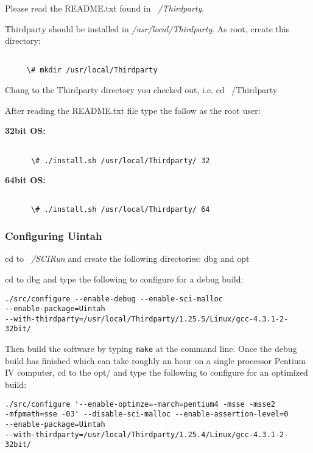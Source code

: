 \documentclass[12pt]{report}
\begin{document}
Please read the README.txt found in \emph{~/Thirdparty}.

Thirdparty should be installed in \emph{/usr/local/Thirdparty}.  As
root, create this directory:

\begin{verbatim}

     \# mkdir /usr/local/Thirdparty

\end{verbatim}

Chang to the Thirdparty directory you checked out, i.e. cd ~/Thirdparty

After reading the README.txt file type the follow as the root user:

\textbf{32bit OS:}

\begin{verbatim}

      \# ./install.sh /usr/local/Thirdparty/ 32

\end{verbatim}

\textbf{64bit OS:}


\begin{verbatim}

      \# ./install.sh /usr/local/Thirdparty/ 64

\end{verbatim}


\subsubsection{Configuring Uintah}

cd to \emph{~/SCIRun} and create the following directories: dbg and opt

cd to dbg and type the following to configure for a debug build:

\begin{verbatim}
./src/configure --enable-debug --enable-sci-malloc 
--enable-package=Uintah 
--with-thirdparty=/usr/local/Thirdparty/1.25.5/Linux/gcc-4.3.1-2-32bit/
\end{verbatim}

Then build the software by typing \texttt{make} at the command
line. Once the debug build has finished which can take roughly an hour
on a single processor Pentium IV computer, cd to the opt/ and type the
following to configure for an optimized build:

\begin{verbatim}
./src/configure '--enable-optimze=-march=pentium4 -msse -msse2 
-mfpmath=sse -03' --disable-sci-malloc --enable-assertion-level=0 
--enable-package=Uintah 
--with-thirdparty=/usr/local/Thirdparty/1.25.4/Linux/gcc-4.3.1-2-32bit/
\end{verbatim}
\end{document}
